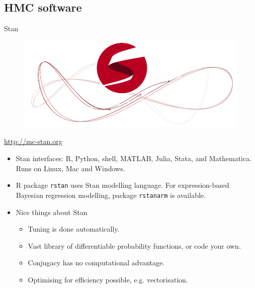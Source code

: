 \documentclass{beamer}\usepackage[]{graphicx}\usepackage[]{color}
\begin{document}
\subsection{HMC software}

\begin{frame}{Stan}
	\vspace{-5mm}
	\begin{figure}[hbt]
		\includegraphics[scale=0.25]{figure/mc-stan}
	\end{figure}
	\vspace{-5mm}

	\centering \url{http://mc-stan.org}
	\vspace{3mm}

	\begin{itemize}
		\item Stan interfaces: R, Python, shell, MATLAB, Julia, Stata, and Mathematica. Runs on Linux, Mac and Windows.
		\item R package \texttt{rstan} uses Stan modelling language. For expression-based Bayesian regression modelling, package \texttt{rstanarm} is available.
		\item Nice things about Stan
		\begin{itemize}
			\item Tuning is done automatically.
			\item Vast library of differentiable probability functions, or code your own.
			\item Conjugacy has no computational advantage.
			\item Optimising for efficiency possible, e.g. vectorisation.
		\end{itemize}
	\end{itemize}
\end{frame}
\end{document}
